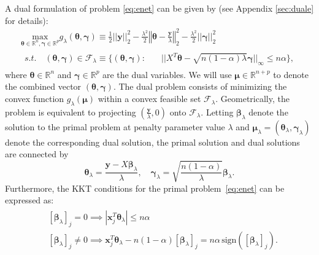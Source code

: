 A dual formulation of problem \eqref{eq:enet} can be given by (see Appendix \ref{sec:duale} for details):
\begin{gather}
        \label{eq:dualtheta}
        \underset{\boldsymbol\theta\in \mathbb{R}^{ n},\boldsymbol\gamma\in\mathbb{R}^p}{\mathrm{max}}g_\lambda(\boldsymbol\theta,\boldsymbol\gamma)\equiv\frac{1}{2}||\boldsymbol y||_2^2-\frac{\lambda^2}{2}\left\Vert\boldsymbol\theta-\frac{\boldsymbol y}{\lambda}\right\Vert_2^2-\frac{\lambda^2}{2}||\boldsymbol\gamma||_2^2\\
        \begin{aligned}s.t.\quad (\boldsymbol\theta,\boldsymbol\gamma)\in \mathcal{F}_\lambda\equiv\{(\boldsymbol\theta,\boldsymbol\gamma):\quad
            &||X^T\boldsymbol\theta-\sqrt{n(1-\alpha)\lambda}\boldsymbol\gamma||_\infty\leq n\alpha\}\nonumber,
        \end{aligned}
\end{gather}
where $\boldsymbol\theta\in \mathbb{R}^{n}$ and $\boldsymbol\gamma\in\mathbb{R}^p$ are the dual variables. We will use $\boldsymbol\mu\in \mathbb{R}^{n+p}$ to denote the combined vector $(\boldsymbol \theta,\boldsymbol\gamma)$. The dual problem consists of minimizing the convex function $g_\lambda(\boldsymbol\mu)$ within a convex feasible set $\mathcal{F}_\lambda$. Geometrically, the problem is equivalent to projecting $(\frac{\boldsymbol y}{\lambda},0)$ onto $\mathcal{F}_\lambda$. Letting $\boldsymbol\beta_\lambda$ denote the solution to the primal problem at penalty parameter value $\lambda$ and $\boldsymbol\mu_{\lambda}=(\boldsymbol\theta_{\lambda},\boldsymbol\gamma_\lambda)$ denote the corresponding dual solution, the primal solution and dual solutions are connected by
\begin{equation}
    \label{eq:dualprimal}
    \boldsymbol\theta_\lambda=\frac{\boldsymbol y-X\boldsymbol\beta_\lambda}{\lambda},\quad \boldsymbol\gamma_\lambda=\sqrt{\frac{n(1-\alpha)}{\lambda}}\boldsymbol\beta_\lambda.
\end{equation}
Furthermore, the KKT conditions for the primal problem~\eqref{eq:enet} can be expressed as:
\begin{gather}
    \label{eq:kkte}
    \begin{aligned}&[\boldsymbol\beta_\lambda]_{j}=0\implies|\boldsymbol x_j^T\boldsymbol\theta_\lambda|\leq n\alpha\\
    & [\boldsymbol\beta_\lambda]_{j}\neq0\implies  \boldsymbol x_j^T\boldsymbol\theta_\lambda-n(1-\alpha)[\boldsymbol\beta_\lambda]_{j}=n\alpha\,\textrm{sign}([\boldsymbol\beta_\lambda]_{j}).
    \end{aligned}
\end{gather}
